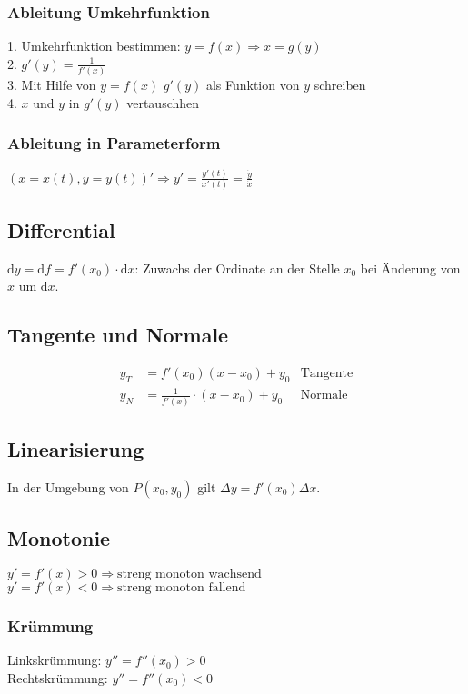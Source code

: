\subsubsection{Ableitung Umkehrfunktion}
1. Umkehrfunktion bestimmen: $y = f(x) \Rightarrow x = g(y)$\\
2. $g'(y) = \frac{1}{f'(x)}$\\
3. Mit Hilfe von $y = f(x)$ $g'(y)$ als Funktion von $y$ schreiben\\
4. $x$ und $y$ in $g'(y)$ vertauschhen\\

\subsubsection{Ableitung in Parameterform}
$(x = x(t), y = y(t))' \Rightarrow y' = \frac{y'(t)}{x'(t)} = \frac{\dot{y}}{\dot{x}}$

\subsection{Differential}
$\mathrm dy = \mathrm df = f'(x_0) \cdot \mathrm dx$: Zuwachs der Ordinate an der Stelle $x_0$ bei Änderung von $x$ um $\mathrm dx$.

\subsection{Tangente und Normale}
\begin{align*}
	y_T& = f'(x_0)(x - x_0) + y_0 & \mbox{Tangente}\\
	y_N& = \frac{1}{f'(x)} \cdot (x - x_0) + y_0 & \mbox{Normale}
\end{align*}

\subsection{Linearisierung}
In der Umgebung von $P(x_0, y_0)$ gilt $\Delta y = f'(x_0) \Delta x$.

\subsection{Monotonie}
$y' = f'(x) > 0 \Rightarrow \mbox{streng monoton wachsend}$\\
$y' = f'(x) < 0 \Rightarrow \mbox{streng monoton fallend}$\\

\subsubsection{Krümmung}
Linkskrümmung: $y'' = f''(x_0) > 0$\\
Rechtskrümmung: $y'' = f''(x_0) < 0$\\
 
